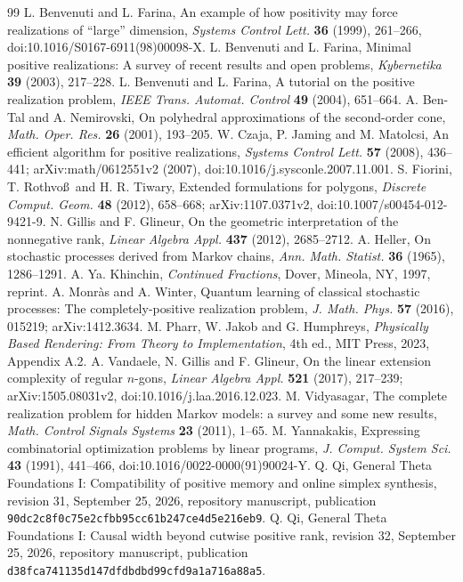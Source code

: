 \begin{thebibliography}{99}
 L. Benvenuti and L. Farina,
An example of how positivity may force realizations of ``large'' dimension,
\emph{Systems Control Lett.} \textbf{36} (1999), 261--266,
doi:10.1016/S0167-6911(98)00098-X.
 L. Benvenuti and L. Farina,
Minimal positive realizations: A survey of recent results and open problems,
\emph{Kybernetika} \textbf{39} (2003), 217--228.
 L. Benvenuti and L. Farina,
A tutorial on the positive realization problem,
\emph{IEEE Trans. Automat. Control} \textbf{49} (2004), 651--664.
 A. Ben-Tal and A. Nemirovski,
On polyhedral approximations of the second-order cone,
\emph{Math. Oper. Res.} \textbf{26} (2001), 193--205.
 W. Czaja, P. Jaming and M. Matolcsi,
An efficient algorithm for positive realizations,
\emph{Systems Control Lett.} \textbf{57} (2008), 436--441;
arXiv:math/0612551v2 (2007), doi:10.1016/j.sysconle.2007.11.001.
 S. Fiorini, T. Rothvo\ss\ and H. R. Tiwary,
Extended formulations for polygons,
\emph{Discrete Comput. Geom.} \textbf{48} (2012), 658--668;
arXiv:1107.0371v2, doi:10.1007/s00454-012-9421-9.
 N. Gillis and F. Glineur,
On the geometric interpretation of the nonnegative rank,
\emph{Linear Algebra Appl.} \textbf{437} (2012), 2685--2712.
 A. Heller,
On stochastic processes derived from Markov chains,
\emph{Ann. Math. Statist.} \textbf{36} (1965), 1286--1291.
 A. Ya. Khinchin,
\emph{Continued Fractions}, Dover, Mineola, NY, 1997, reprint.
 A. Monr\`as and A. Winter,
Quantum learning of classical stochastic processes:
The completely-positive realization problem,
\emph{J. Math. Phys.} \textbf{57} (2016), 015219;
arXiv:1412.3634.
 M. Pharr, W. Jakob and G. Humphreys,
\emph{Physically Based Rendering: From Theory to Implementation},
4th ed., MIT Press, 2023, Appendix A.2.
 A. Vandaele, N. Gillis and F. Glineur,
On the linear extension complexity of regular $n$-gons,
\emph{Linear Algebra Appl.} \textbf{521} (2017), 217--239;
arXiv:1505.08031v2, doi:10.1016/j.laa.2016.12.023.
 M. Vidyasagar,
The complete realization problem for hidden Markov models: a survey
and some new results,
\emph{Math. Control Signals Systems} \textbf{23} (2011), 1--65.
 M. Yannakakis,
Expressing combinatorial optimization problems by linear programs,
\emph{J. Comput. System Sci.} \textbf{43} (1991), 441--466,
doi:10.1016/0022-0000(91)90024-Y.
 Q. Qi,
General Theta Foundations I: Compatibility of positive memory and online
simplex synthesis, revision 31, September 25, 2026,
repository manuscript, publication
\texttt{90dc2c8f0c75e2cfbb95cc61b247ce4d5e216eb9}.
 Q. Qi,
General Theta Foundations I: Causal width beyond cutwise positive rank,
revision 32, September 25, 2026, repository manuscript, publication
\texttt{d38fca741135d147dfdbdbd99cfd9a1a716a88a5}.
\end{thebibliography}

